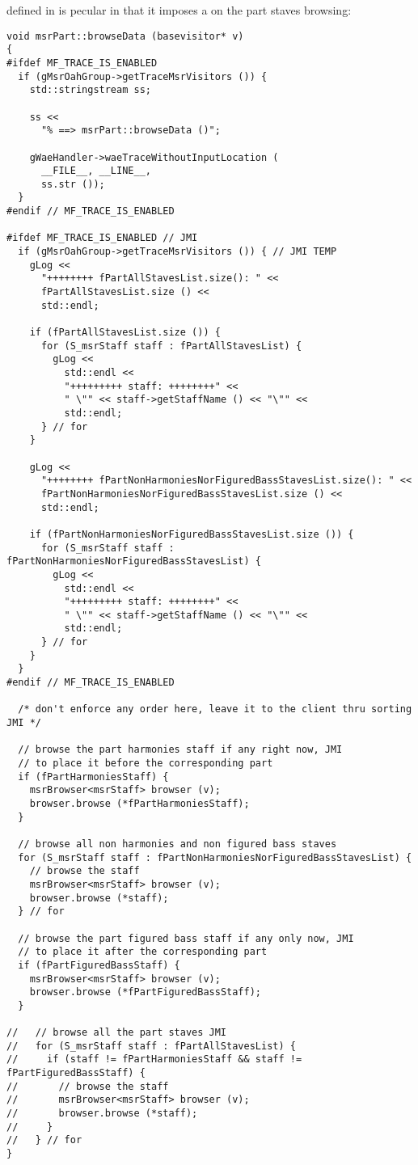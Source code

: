  defined in  is pecular in that it imposes a  on the part staves browsing: %
\begin{lstlisting}[language=CPlusPlus]
void msrPart::browseData (basevisitor* v)
{
#ifdef MF_TRACE_IS_ENABLED
  if (gMsrOahGroup->getTraceMsrVisitors ()) {
    std::stringstream ss;

    ss <<
      "% ==> msrPart::browseData ()";

    gWaeHandler->waeTraceWithoutInputLocation (
      __FILE__, __LINE__,
      ss.str ());
  }
#endif // MF_TRACE_IS_ENABLED

#ifdef MF_TRACE_IS_ENABLED // JMI
  if (gMsrOahGroup->getTraceMsrVisitors ()) { // JMI TEMP
    gLog <<
      "++++++++ fPartAllStavesList.size(): " <<
      fPartAllStavesList.size () <<
      std::endl;

    if (fPartAllStavesList.size ()) {
      for (S_msrStaff staff : fPartAllStavesList) {
        gLog <<
          std::endl <<
          "+++++++++ staff: ++++++++" <<
          " \"" << staff->getStaffName () << "\"" <<
          std::endl;
      } // for
    }

    gLog <<
      "++++++++ fPartNonHarmoniesNorFiguredBassStavesList.size(): " <<
      fPartNonHarmoniesNorFiguredBassStavesList.size () <<
      std::endl;

    if (fPartNonHarmoniesNorFiguredBassStavesList.size ()) {
      for (S_msrStaff staff : fPartNonHarmoniesNorFiguredBassStavesList) {
        gLog <<
          std::endl <<
          "+++++++++ staff: ++++++++" <<
          " \"" << staff->getStaffName () << "\"" <<
          std::endl;
      } // for
    }
  }
#endif // MF_TRACE_IS_ENABLED

  /* don't enforce any order here, leave it to the client thru sorting JMI */

  // browse the part harmonies staff if any right now, JMI
  // to place it before the corresponding part
  if (fPartHarmoniesStaff) {
    msrBrowser<msrStaff> browser (v);
    browser.browse (*fPartHarmoniesStaff);
  }

  // browse all non harmonies and non figured bass staves
  for (S_msrStaff staff : fPartNonHarmoniesNorFiguredBassStavesList) {
    // browse the staff
    msrBrowser<msrStaff> browser (v);
    browser.browse (*staff);
  } // for

  // browse the part figured bass staff if any only now, JMI
  // to place it after the corresponding part
  if (fPartFiguredBassStaff) {
    msrBrowser<msrStaff> browser (v);
    browser.browse (*fPartFiguredBassStaff);
  }

//   // browse all the part staves JMI
//   for (S_msrStaff staff : fPartAllStavesList) {
//     if (staff != fPartHarmoniesStaff && staff != fPartFiguredBassStaff) {
//       // browse the staff
//       msrBrowser<msrStaff> browser (v);
//       browser.browse (*staff);
//     }
//   } // for
}
\end{lstlisting}


